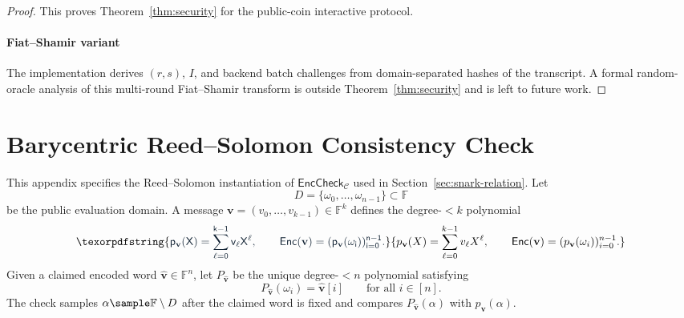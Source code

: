 \documentclass[conference,compsoc]{IEEEtran}
\newcommand{\vect}{\mathbf}         %
\renewcommand{\enc}{\mathsf{Enc}}   %
\theoremstyle{plain}
\theoremstyle{definition}
\theoremstyle{remark}
\providecommand{\DIFaddtex}[1]{{\protect\color{DIFADD} \sf #1}} %
\providecommand{\DIFaddbegin}{} %
\providecommand{\DIFaddend}{} %
\providecommand{\DIFadd}[1]{\texorpdfstring{\DIFaddtex{#1}}{#1}} %
\providecommand{\DIFaddincludegraphics}[2][]{{\color{blue}\fbox{\DIFOincludegraphics[#1]{#2}}}} %
\DeclareRobustCommand{\DIFaddbegin}{\DIFOaddbegin \let\includegraphics\DIFaddincludegraphics} %
\DeclareRobustCommand{\DIFaddend}{\DIFOaddend \let\includegraphics\DIFOincludegraphics} %
\begin{document}
\begin{proof}
\DIFadd{This proves Theorem~\ref{thm:security} for the public-coin interactive protocol}\DIFaddend .

\paragraph{Fiat--Shamir variant}
The  \DIFaddbegin \DIFadd{implementation derives \((r,s)\)}\DIFaddend , \(I\), and backend batch challenges from
domain-separated hashes of the transcript.  \DIFaddbegin \DIFadd{A formal }\DIFaddend random-oracle  \DIFaddbegin \DIFadd{analysis of
this multi-round Fiat--Shamir transform is outside }\DIFaddend Theorem~\ref{thm:security}
\DIFaddbegin \DIFadd{and is left to future work}\DIFaddend .
\end{proof}

\section{Barycentric Reed--Solomon Consistency Check}
\label{app:rs-barycentric}

This appendix specifies the Reed--Solomon instantiation of
\(\mathsf{EncCheck}_{\mathcal{C}}\) used in
Section~\ref{sec:snark-relation}.  Let
\[
D=\{\omega_0,\ldots,\omega_{n-1}\}\subset\mathbb{F}
\]
be the public evaluation domain.  A message
\(\vect{v}=(v_0,\ldots,v_{k-1})\in\mathbb{F}^k\) defines the degree-\(<k\)
polynomial
 \DIFaddbegin \[
  \DIFadd{p_{\vect{v}}(X)=\sum_{\ell=0}^{k-1} v_\ell X^\ell,
  \qquad
  \enc(\vect{v})=(p_{\vect{v}}(\omega_i))_{i=0}^{n-1}.
}\]\DIFaddend 
Given a claimed encoded word
\(\widehat{\vect{v}}\in\mathbb{F}^n\), let
\(P_{\widehat{\vect{v}}}\) be the unique degree-\(<n\) polynomial satisfying
\[
  P_{\widehat{\vect{v}}}(\omega_i)=\widehat{\vect{v}}[i]
  \qquad\text{for all }i\in[n].
\]
The check samples \(\alpha\sample\mathbb{F}\setminus D\) after the claimed
word is fixed and compares \(P_{\widehat{\vect{v}}}(\alpha)\) with
\(p_{\vect{v}}(\alpha)\).
\end{document}
